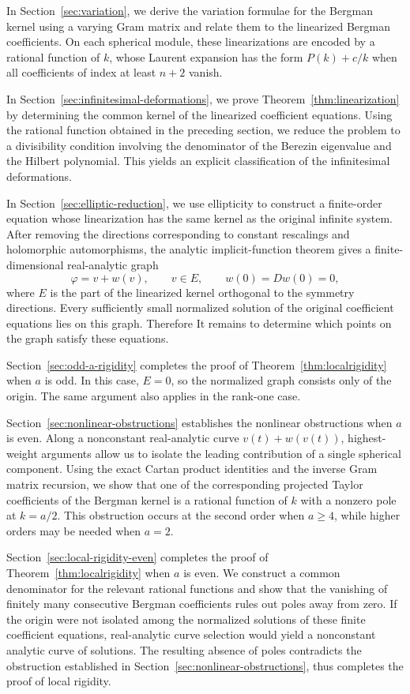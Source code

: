 \documentclass[11pt,reqno]{amsart}
\theoremstyle{corollary}
\theoremstyle{conjecture}
\theoremstyle{assumption}
\theoremstyle{proposition}
\theoremstyle{remark}
\numberwithin{equation}{section}
\begin{document}
In Section~\ref{sec:variation}, we derive the variation formulae for the Bergman kernel using a varying Gram matrix and relate them to the linearized Bergman coefficients. On each spherical module, these linearizations are encoded by a rational function of $k$, whose Laurent expansion has the form $P(k)+c/k$ when all coefficients of index at least $n+2$ vanish.

In Section~\ref{sec:infinitesimal-deformations}, we prove Theorem~\ref{thm:linearization} by determining the common kernel of the linearized coefficient equations. Using the rational function obtained in the preceding section, we reduce the problem to a divisibility condition involving the denominator of the Berezin eigenvalue and the Hilbert polynomial. This yields an explicit classification of the infinitesimal deformations.

In Section~\ref{sec:elliptic-reduction}, we use ellipticity to construct a finite-order equation whose linearization has the same kernel as the original infinite system. After removing the directions corresponding to constant rescalings and holomorphic automorphisms, the analytic implicit-function theorem gives a finite-dimensional real-analytic graph
\[
\varphi=v+w(v),\qquad v\in E,\qquad w(0)=Dw(0)=0,
\]
where $E$ is the part of the linearized kernel orthogonal to the symmetry directions. Every sufficiently small normalized solution of the original coefficient equations lies on this graph. Therefore It remains to determine which points on the graph satisfy these equations.

Section~\ref{sec:odd-a-rigidity} completes the proof of Theorem~\ref{thm:localrigidity} when $a$ is odd. In this case, $E=0$, so the normalized graph consists only of the origin. The same argument also applies in the rank-one case.

Section~\ref{sec:nonlinear-obstructions} establishes the nonlinear obstructions when $a$ is even. Along a nonconstant real-analytic curve $v(t)+w(v(t))$, highest-weight arguments allow us to isolate the leading contribution of a single spherical component. Using the exact Cartan product identities and the inverse Gram matrix recursion, we show that one of the corresponding projected Taylor coefficients of the Bergman kernel is a rational function of $k$ with a nonzero pole at $k=a/2$. This obstruction occurs at the second order when $a\geq4$, while higher orders may be needed when $a=2$.

Section~\ref{sec:local-rigidity-even} completes the proof of Theorem~\ref{thm:localrigidity} when $a$ is even. We construct a common denominator for the relevant rational functions and show that the vanishing of finitely many consecutive Bergman coefficients rules out poles away from zero. If the origin were not isolated among the normalized solutions of these finite coefficient equations, real-analytic curve selection would yield a nonconstant analytic curve of solutions. The resulting absence of poles contradicts the obstruction established in Section~\ref{sec:nonlinear-obstructions}, thus completes the proof of local rigidity.
\end{document}
